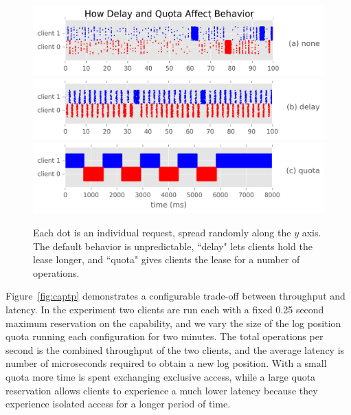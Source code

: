 \begin{figure}[tbp]
\centering
\includegraphics{figures/capdelay-quota-behavior-a.png}
\includegraphics{figures/capdelay-quota-behavior-b.png}
\includegraphics{figures/capdelay-quota-behavior-c.png}
\caption{Each dot is an individual request, spread randomly along the \(y\)
axis. The default behavior is unpredictable, ``delay" lets clients hold the
lease longer, and ``quota" gives clients the lease for a number of operations.}
\label{fig:capdelay-quota-behavior}
\end{figure}

Figure~\ref{fig:captp} demonstrates a configurable trade-off between throughput
and latency. In the experiment two clients are run each with a fixed 0.25
second maximum reservation on the capability, and we vary the size of the log
position quota running each configuration for two minutes. The total operations
per second is the combined throughput of the two clients, and the average
latency is number of microseconds required to obtain a new log position. With a
small quota more time is spent exchanging exclusive access, while a large quota
reservation allows clients to experience a much lower latency because they
experience isolated access for a longer period of time.

